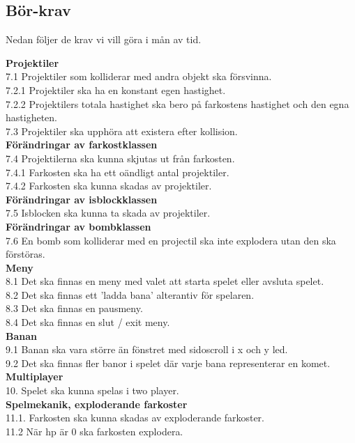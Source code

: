 \documentclass{TDP005mall}
\begin{document}
\subsection{Bör-krav}
Nedan följer de krav vi vill göra i mån av tid. 

\textbf{Projektiler}\\
7.1 Projektiler som kolliderar med andra objekt ska försvinna. \\
7.2.1 Projektiler ska ha en konstant egen hastighet. \\
7.2.2 Projektilers totala hastighet ska bero på farkostens hastighet och den
egna hastigheten. \\
7.3 Projektiler ska upphöra att existera efter kollision. \\
\textbf{Förändringar av farkostklassen}\\
7.4 Projektilerna ska kunna skjutas ut från farkosten. \\
7.4.1 Farkosten ska ha ett oändligt antal projektiler. \\ 
7.4.2 Farkosten ska kunna skadas av projektiler. \\
\textbf{Förändringar av isblockklassen}\\
7.5 Isblocken ska kunna ta skada av projektiler. \\
\textbf{Förändringar av bombklassen}\\
7.6 En bomb som kolliderar med en projectil ska inte explodera utan den ska
förstöras.\\

\textbf{Meny}\\
8.1 Det ska finnas en meny med valet att starta spelet eller avsluta
spelet.\\
8.2 Det ska finnas ett 'ladda bana' alterantiv för spelaren.\\
8.3 Det ska finnas en pausmeny.\\
8.4 Det ska finnas en slut / exit meny.\\

\textbf{Banan}\\
9.1 Banan ska vara större än fönstret med sidoscroll i x och y led.\\
9.2 Det ska finnas fler banor i spelet där varje bana representerar en komet.\\

\textbf{Multiplayer}\\
10. Spelet ska kunna spelas i two player.\\

\textbf{Spelmekanik, exploderande farkoster}\\
11.1. Farkosten ska kunna skadas av exploderande farkoster. \\
11.2 När hp är 0 ska farkosten explodera. \\
\end{document}
